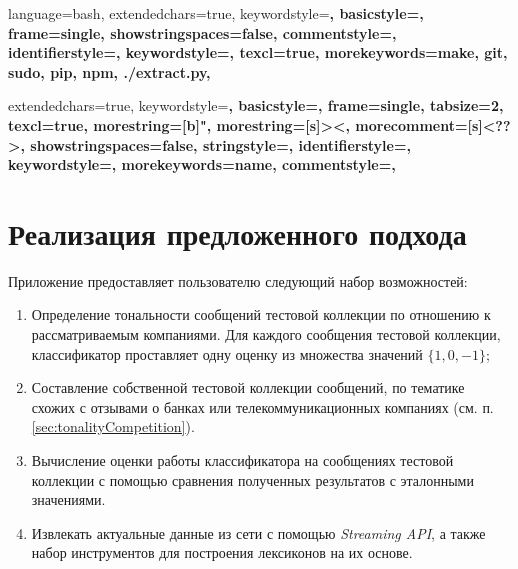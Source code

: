 
{
    language=bash,
    extendedchars=true,
    keywordstyle=\bfseries,
    basicstyle=\footnotesize,
    frame=single,
    showstringspaces=false,
    commentstyle=\color{red},
    identifierstyle=\color{black},
    keywordstyle=\color{blue},
    texcl=true,
    morekeywords={make, git, sudo, pip, npm, ./extract.py},
}

{
    extendedchars=true,
    keywordstyle=\bfseries,
    basicstyle=\footnotesize,
    frame=single,
    tabsize=2,
    texcl=true,
    morestring=[b]",
    morestring=[s]{>}{<},
    morecomment=[s]{<?}{?>},
    showstringspaces=false,
    stringstyle=\color{black},
    identifierstyle=\color{darkblue},
    keywordstyle=\color{cyan},
    morekeywords={name},
    commentstyle=\color{gray},
}
\newcommand\xml{{\it XML }}

\newpage
\section{Реализация предложенного подхода}
    Приложение предоставляет пользователю следующий набор возможностей:
    \begin{enumerate}
        \item Определение тональности сообщений тестовой коллекции по отношению к
        рассматриваемым компаниями. Для каждого сообщения тестовой коллекции,
        классификатор проставляет одну оценку из множества значений $\{1, 0, -1\}$;
        \item Составление собственной тестовой коллекции сообщений, по тематике
        схожих с отзывами о банках или телекоммуникационных компаниях
        (см. п. \ref{sec:tonalityCompetition}).
        \item Вычисление оценки работы классификатора на сообщениях тестовой
        коллекции с помощью сравнения полученных результатов с эталонными значениями.
        \item Извлекать актуальные данные из сети \twitter с помощью
        {\it Streaming API}, а также набор инструментов для построения лексиконов
        на их основе.
    \end{enumerate}

    

    

    
